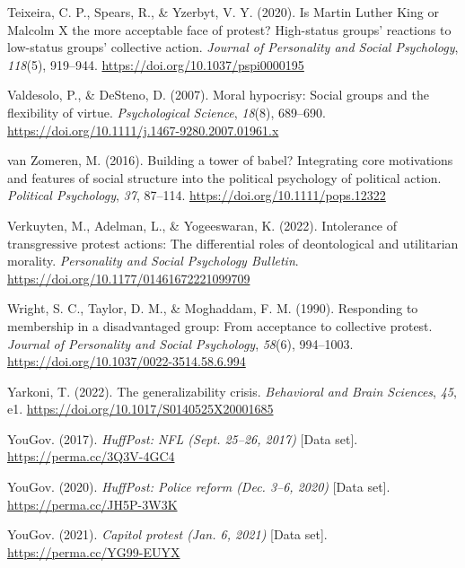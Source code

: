\documentclass[12pt, letterpaper]{article}
\newenvironment{CSLReferences}[2]{}{}
\begin{document}
\begin{CSLReferences}{1}{0}
\leavevmode{}%
Teixeira, C. P., Spears, R., \& Yzerbyt, V. Y. (2020). Is {Martin}
{Luther} {King} or {Malcolm} {X} the more acceptable face of protest?
{High}-status groups' reactions to low-status groups' collective action.
\emph{Journal of Personality and Social Psychology}, \emph{118}(5),
919--944. \url{https://doi.org/10.1037/pspi0000195}

\leavevmode{}%
Valdesolo, P., \& DeSteno, D. (2007). Moral hypocrisy: Social groups and
the flexibility of virtue. \emph{Psychological Science}, \emph{18}(8),
689--690. \url{https://doi.org/10.1111/j.1467-9280.2007.01961.x}

\leavevmode{}%
van Zomeren, M. (2016). Building a tower of babel? {Integrating} core
motivations and features of social structure into the political
psychology of political action. \emph{Political Psychology}, \emph{37},
87--114. \url{https://doi.org/10.1111/pops.12322}

\leavevmode{}%
Verkuyten, M., Adelman, L., \& Yogeeswaran, K. (2022). Intolerance of
transgressive protest actions: The differential roles of deontological
and utilitarian morality. \emph{Personality and Social Psychology
Bulletin}. \url{https://doi.org/10.1177/01461672221099709}

\leavevmode{}%
Wright, S. C., Taylor, D. M., \& Moghaddam, F. M. (1990). Responding to
membership in a disadvantaged group: From acceptance to collective
protest. \emph{Journal of Personality and Social Psychology},
\emph{58}(6), 994--1003.
\url{https://doi.org/10.1037/0022-3514.58.6.994}

\leavevmode{}%
Yarkoni, T. (2022). The generalizability crisis. \emph{Behavioral and
Brain Sciences}, \emph{45}, e1.
\url{https://doi.org/10.1017/S0140525X20001685}

\leavevmode{}%
YouGov. (2017). \emph{{HuffPost: NFL} {(Sept. 25--26, 2017)}} {[}Data
set{]}. \url{https://perma.cc/3Q3V-4GC4}

\leavevmode{}%
YouGov. (2020). \emph{{HuffPost}: Police reform {(Dec. 3--6, 2020)}}
{[}Data set{]}. \url{https://perma.cc/JH5P-3W3K}

\leavevmode{}%
YouGov. (2021). \emph{Capitol protest {(Jan. 6, 2021)}} {[}Data set{]}.
\url{https://perma.cc/YG99-EUYX}

\end{CSLReferences}
\end{document}
